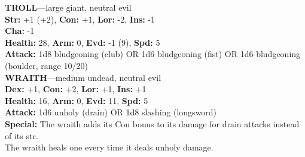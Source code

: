 \documentclass[letterpaper, 12pt, twocolumn]{book}
\def\linedivide{, }
\def\sectionheader#1{\textbf{#1: }}
\begin{document}
\RaggedRight\textbf{TROLL}---large giant, neutral evil\\\sectionheader{Str}+1 (+2)\linedivide\sectionheader{Con}+1\linedivide\sectionheader{Lor}-2\linedivide\sectionheader{Ins}-1\\\sectionheader{Cha}-1\\\sectionheader{Health}28\linedivide\sectionheader{Arm}0\linedivide\sectionheader{Evd}-1 (9)\linedivide\sectionheader{Spd}5\\\sectionheader{Attack}1d8 bludgeoning (club) OR 1d6 bludgeoning (fist) OR 1d6 bludgeoning (boulder, range 10/20)\\\bigskip\textbf{WRAITH}---medium undead, neutral evil\\\sectionheader{Dex}+1\linedivide\sectionheader{Con}+2\linedivide\sectionheader{Lor}+1\linedivide\sectionheader{Ins}+1\\\sectionheader{Health}16\linedivide\sectionheader{Arm}0\linedivide\sectionheader{Evd}11\linedivide\sectionheader{Spd}5\\\sectionheader{Attack}1d6 unholy (drain) OR 1d8 slashing (longsword)\\\sectionheader{Special}The wraith adds its Con bonus to its damage for drain attacks instead of its str.\\The wraith heals one every time it deals unholy damage.\\\bigskip
\end{document}
